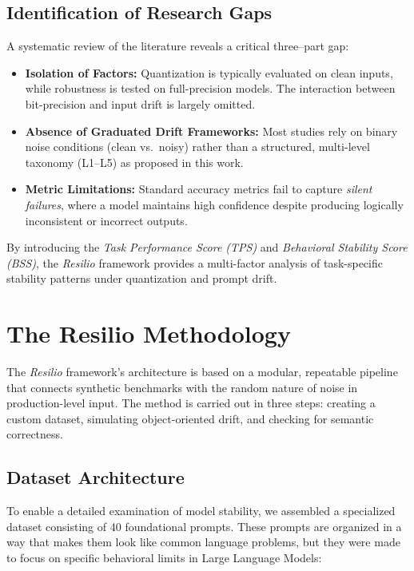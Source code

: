 \documentclass[conference]{IEEEtran}
\begin{document}
\subsection{Identification of Research Gaps}

A systematic review of the literature reveals a critical three--part gap:

\begin{itemize}
\item \textbf{Isolation of Factors:} Quantization is typically evaluated on clean inputs, while robustness is tested on full-precision models. The interaction between bit-precision and input drift is largely omitted.

\item \textbf{Absence of Graduated Drift Frameworks:} Most studies rely on binary noise conditions (clean vs.\ noisy) rather than a structured, multi-level taxonomy (L1--L5) as proposed in this work.

\item \textbf{Metric Limitations:} Standard accuracy metrics fail to capture \textit{silent failures}, where a model maintains high confidence despite producing logically inconsistent or incorrect outputs.
\end{itemize}

By introducing the \textit{Task Performance Score (TPS)} and \textit{Behavioral Stability Score (BSS)}, the \textit{Resilio} framework provides a multi-factor analysis of task-specific stability patterns under quantization and prompt drift.

\section{The Resilio Methodology}

The \textit{Resilio} framework's architecture is based on a modular, repeatable pipeline that connects synthetic benchmarks with the random nature of noise in production-level input. The method is carried out in three steps: creating a custom dataset, simulating object-oriented drift, and checking for semantic correctness.

\subsection{Dataset Architecture}

To enable a detailed examination of model stability, we assembled a specialized dataset consisting of 40 foundational prompts. These prompts are organized in a way that makes them look like common language problems, but they were made to focus on specific behavioral limits in Large Language Models:
\end{document}

